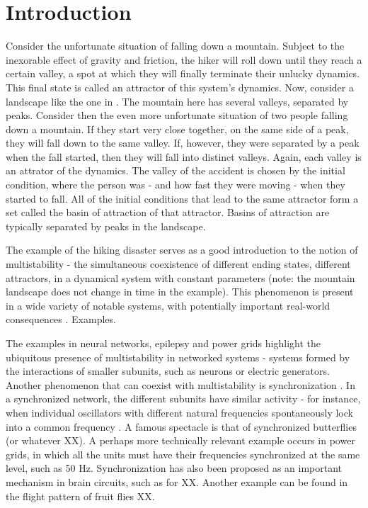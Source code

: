 \chapter{Introduction}
Consider the unfortunate situation of falling down a mountain. Subject to the inexorable effect of gravity and friction, the hiker will roll down until they reach a certain valley, a spot at which they will finally terminate their unlucky dynamics. This final state is called an attractor of this system's dynamics. Now, consider a landscape like the one in . The mountain here has several valleys, separated by peaks. Consider then the even more unfortunate situation of two people falling down a mountain. If they start very close together, on the same side of a peak, they will fall down to the same valley. If, however, they were separated by a peak when the fall started, then they will fall into distinct valleys. Again, each valley is an attrator of the dynamics. The valley of the accident is chosen by the initial condition, where the person was - and how fast they were moving - when they started to fall. All of the initial conditions that lead to the same attractor form a set called the basin of attraction of that attractor. Basins of attraction are typically separated by peaks in the landscape.
%
\begin{figure}
    \centering
    \label{Landscape with valleys and peaks constitutes an example of multistability for an unfortunate falling person.}
\end{figure}


The example of the hiking disaster serves as a good introduction to the notion of multistability - the simultaneous coexistence of different ending states, different attractors, in a dynamical system with constant parameters (note: the mountain landscape does not change in time in the example). This phenomenon is present in a wide variety of notable systems, with potentially important real-world consequences \cite{}. Examples.

The examples in neural networks, epilepsy and power grids highlight the ubiquitous presence of multistability in networked systems - systems formed by the interactions of smaller subunits, such as neurons or electric generators.  Another phenomenon that can coexist with multistability is synchronization \cite{}. In a synchronized network, the different subunits have similar activity - for instance, when individual oscillators with different natural frequencies spontaneously lock into a common frequency \cite{strogatz2000from}. A famous spectacle is that of synchronized butterflies (or whatever XX). A perhaps more technically relevant example occurs in power grids, in which all the units must have their frequencies synchronized at the same level, such as 50 Hz. Synchronization has also been proposed as an important mechanism in brain circuits, such as for XX. Another example can be found in the flight pattern of fruit flies XX. 

